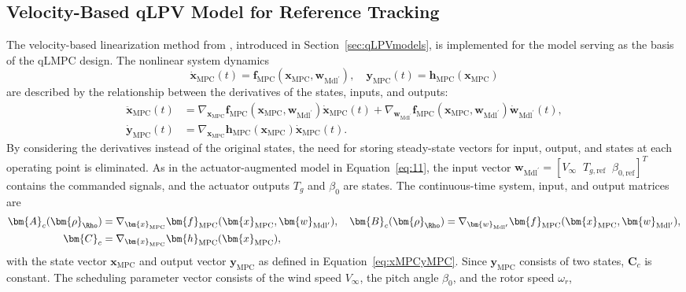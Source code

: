 \subsection{Velocity-Based qLPV Model for Reference Tracking}
The velocity-based linearization method from \cite{cisneros2020velocity}, introduced in Section~\ref{sec:qLPVmodels}, is implemented for the model serving as the basis of the qLMPC design. The nonlinear system dynamics
\[
\dot{\bm{x}}_{\text{MPC}}(t) = \bm{f}_{\text{MPC}}(\bm{x}_{\text{MPC}}, \bm{w}_{\text{Mdl}^\prime}), \quad \bm{y}_{\text{MPC}}(t) = \bm{h}_{\text{MPC}}(\bm{x}_{\text{MPC}})
\]
are described by the relationship between the derivatives of the states, inputs, and outputs:
\begin{align*}
    \ddot{\bm{x}}_{\text{MPC}}(t) &= \nabla_{\bm{x}_{\text{MPC}}} \bm{f}_{\text{MPC}}(\bm{x}_{\text{MPC}}, \bm{w}_{\text{Mdl}^\prime}) \dot{\bm{x}}_{\text{MPC}}(t) + \nabla_{\bm{w}_{\text{Mdl}^\prime}} \bm{f}_{\text{MPC}}(\bm{x}_{\text{MPC}}, \bm{w}_{\text{Mdl}^\prime}) \dot{\bm{w}}_{\text{Mdl}^\prime}(t),\\
    \dot{\bm{y}}_{\text{MPC}}(t) &= \nabla_{\bm{x}_{\text{MPC}}} \bm{h}_{\text{MPC}}(\bm{x}_{\text{MPC}}) \dot{\bm{x}}_{\text{MPC}}(t).
\end{align*}
By considering the derivatives instead of the original states, the need for storing steady-state vectors for input, output, and states at each operating point is eliminated.
As in the actuator-augmented model in Equation~\eqref{eq:11}, the input vector $\bm{w}_{\text{Mdl}^\prime} = [V_{\infty} \;\; T_{g,\text{ref}} \;\; \beta_{0,\text{ref}}]^T$ contains the commanded signals, and the actuator outputs $T_g$ and $\beta_0$ are states.
%
The continuous-time system, input, and output matrices are
\begin{align*}
    \bm{A}_c(\bm{\rho}_\Rho) &= \nabla_{\bm{x}_{\text{MPC}}} \bm{f}_{\text{MPC}}(\bm{x}_{\text{MPC}}, \bm{w}_{\text{Mdl}^\prime}),\quad
    \bm{B}_c(\bm{\rho}_\Rho) = \nabla_{\bm{w}_{\text{Mdl}^\prime}} \bm{f}_{\text{MPC}}(\bm{x}_{\text{MPC}}, \bm{w}_{\text{Mdl}^\prime}),\\
    \bm{C}_c &= \nabla_{\bm{x}_{\text{MPC}}} \bm{h}_{\text{MPC}}(\bm{x}_{\text{MPC}}),
\end{align*}
with the state vector $\bm{x}_{\text{MPC}}$ and output vector $\bm{y}_{\text{MPC}}$ as defined in Equation~\eqref{eq:xMPCyMPC}. Since $\bm{y}_{\text{MPC}}$ consists of two states, $\bm{C}_c$ is constant. The scheduling parameter vector consists of the wind speed $V_{\infty}$, the pitch angle $\beta_0$, and the rotor speed $\omega_r$,
